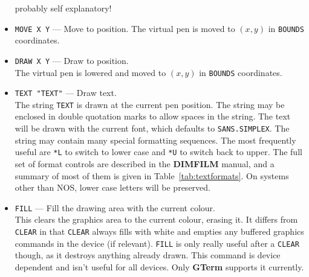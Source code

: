 \documentclass[a4paper,twoside,11pt]{article}
\newcommand{\textttc}[1]{\texttt{\textcolor{OurRed}{#1}}}
\begin{document}
\begin{itemize}
   probably self explanatory!
\item \textttc{MOVE X Y} --- Move to position.
   The virtual pen is moved to $(x,y)$ in \texttt{BOUNDS} coordinates.
\item \textttc{DRAW X Y} --- Draw to position.\\
   The virtual pen is lowered and moved to $(x,y)$ in \texttt{BOUNDS} coordinates.
\item \textttc{TEXT "TEXT"} --- Draw text.\\
   The string \texttt{TEXT} is drawn at the current pen position. The string may be enclosed
   in double quotation marks to allow spaces in the string. The text will be drawn
   with the current font, which defaults to \texttt{SANS.SIMPLEX}. The string may contain many special
   formatting sequences. The most frequently useful are \texttt{*L} to switch to lower case
   and \texttt{*U} to switch back to upper. The full set of format controls are described in
   the \textbf{DIMFILM} manual, and a summary of most of them is given in Table~\ref{tab:textformats}.
   On systems other than NOS, lower case letters will be preserved.
\item \textttc{FILL} --- Fill the drawing area with the current colour.\\
   This clears the graphics area to the current colour, erasing it. It differs from
   \texttt{CLEAR} in that \texttt{CLEAR} always fills with white and empties any buffered graphics commands
   in the device (if relevant). \texttt{FILL} is only really useful after a \texttt{CLEAR} though, as it
   destroys anything already drawn. This command is device dependent and isn't useful for all devices.
   Only \textbf{GTerm} supports it currently.
\end{itemize}
\end{document}
